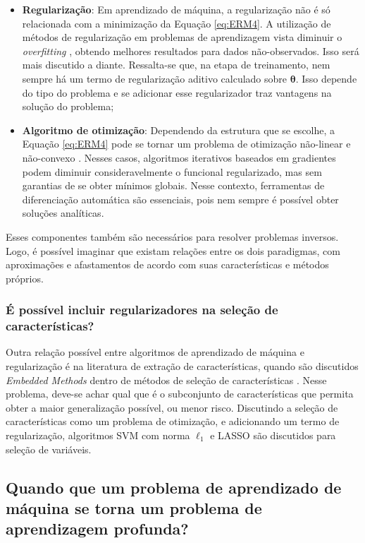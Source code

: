 \begin{itemize}
\item \textbf{Regularização}: Em aprendizado de máquina, a regularização não é só relacionada com a minimização da Equação \eqref{eq:ERM4}. A utilização de métodos de regularização em problemas de aprendizagem vista diminuir o \textit{overfitting} \cite{Prato2008}, obtendo melhores resultados para dados não-observados.  Isso será mais discutido a diante. Ressalta-se que, na etapa de treinamento, nem sempre há um termo de regularização aditivo calculado sobre $\bm{\theta}$. Isso depende do tipo do problema e se adicionar esse regularizador traz vantagens na solução do problema;

\item \textbf{Algoritmo de otimização}: Dependendo da estrutura que se escolhe, a Equação \eqref{eq:ERM4} pode se tornar um problema de otimização não-linear e não-convexo  \cite[pág. 177]{goodfellow2016deep}. Nesses casos, algoritmos iterativos baseados em gradientes podem diminuir consideravelmente o funcional regularizado, mas sem garantias de se obter mínimos globais. Nesse contexto, ferramentas de diferenciação automática são essenciais, pois nem sempre é possível obter soluções analíticas.


\end{itemize}
Esses componentes também são necessários para resolver problemas inversos. Logo, é possível imaginar que existam relações entre os dois paradigmas, com aproximações e afastamentos de acordo com suas características e métodos próprios.


\subsubsection{É possível incluir regularizadores na seleção de características?}\label{sec:feature}
Outra relação possível entre algoritmos de aprendizado de máquina e regularização é na literatura de extração de características, quando são discutidos \textit{Embedded Methods} dentro de métodos de seleção de características \cite{Guyon2006, Nilsson2007}. Nesse problema, deve-se achar qual que é o subconjunto de características que permita obter a maior generalização possível, ou menor risco. Discutindo a seleção de características como um problema de otimização, e adicionando um termo de regularização, algoritmos SVM com norma $\ell_1$ e LASSO são discutidos para seleção de variáveis.  


\subsection{Quando que um problema de aprendizado de máquina se torna um problema de aprendizagem profunda?}


